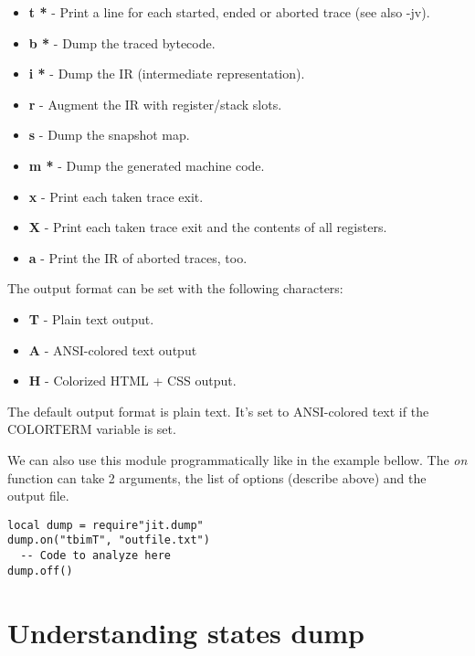 \begin{itemize}
  \item \textbf{t *} - Print a line for each started, ended or aborted trace (see also -jv).
  \item \textbf{b *} - Dump the traced bytecode.
  \item \textbf{i *} - Dump the IR (intermediate representation).
  \item \textbf{r} - Augment the IR with register/stack slots.
  \item \textbf{s} - Dump the snapshot map.
  \item \textbf{m *} - Dump the generated machine code.
  \item \textbf{x} - Print each taken trace exit.
  \item \textbf{X} - Print each taken trace exit and the contents of all registers.
  \item \textbf{a} - Print the IR of aborted traces, too.
\end{itemize}
The output format can be set with the following characters:
\begin{itemize}
   \item \textbf{T} - Plain text output.
   \item \textbf{A} - ANSI-colored text output
   \item \textbf{H} - Colorized HTML + CSS output.
\end{itemize}
The default output format is plain text. It's set to ANSI-colored text
if the COLORTERM variable is set.

We can also use this module programmatically like in the example bellow. The
\emph{on} function can take 2 arguments, the list of options (describe above)
and the output file.
\begin{lstlisting}[style=LuaStyle]
local dump = require"jit.dump"
dump.on("tbimT", "outfile.txt")
  -- Code to analyze here
dump.off()
\end{lstlisting}


\section{Understanding states dump}
\label{Sec:dump-states}

